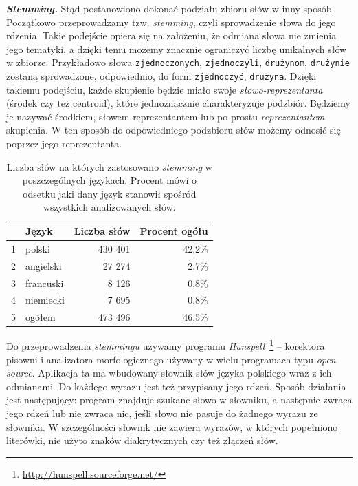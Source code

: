 \documentclass{praca1}
\begin{document}
\emph{\textbf{Stemming.}}
Stąd postanowiono dokonać podziału zbioru słów w inny sposób. Początkowo przeprowadzamy tzw. \emph{stemming}, czyli sprowadzenie słowa do jego rdzenia. Takie podejście opiera się na założeniu, że odmiana słowa nie zmienia jego tematyki, a dzięki temu możemy znacznie ograniczyć liczbę unikalnych słów w zbiorze. Przykładowo słowa \verb|zjednoczonych|, \verb|zjednoczyli|, \verb|drużynom|, \verb|drużynie| zostaną sprowadzone, odpowiednio, do form \verb|zjednoczyć|, \verb|drużyna|. Dzięki takiemu podejściu, każde skupienie będzie miało swoje \emph{słowo-reprezentanta} (środek czy też centroid), które jednoznacznie charakteryzuje podzbiór. Będziemy je nazywać środkiem, słowem-reprezentantem lub po prostu \emph{reprezentantem} skupienia. W ten sposób do odpowiedniego podzbioru słów możemy odnosić się poprzez jego reprezentanta.

\begin{table}[!h]
\centering
\caption{Liczba słów na których zastosowano \emph{stemming} w poszczególnych językach. Procent mówi o odsetku jaki dany język stanowił spośród wszystkich analizowanych słów.}
\begin{tabular}{|rl|rr|}
  \hline
 & Język & Liczba słów & Procent ogółu\\ 
  \hline
1 & polski & 430 401 & 42,2\% \\ 
  2 & angielski & 27 274 & 2,7\% \\ 
  3 & francuski & 8 126 & 0,8\% \\ 
  4 & niemiecki & 7 695 & 0,8\% \\ \hline
  5 & ogółem & 473 496 & 46,5\% \\ 
   \hline
\end{tabular}
\label{tab:002}
\end{table}

Do przeprowadzenia \emph{stemmingu} używamy programu \emph{Hunspell}~\footnote{\url{http://hunspell.sourceforge.net/}} -- korektora pisowni i analizatora morfologicznego używany w wielu programach typu \emph{open source}. Aplikacja ta ma wbudowany słownik słów języka polskiego wraz z ich odmianami. Do każdego wyrazu jest też przypisany jego rdzeń. Sposób działania jest następujący: program znajduje szukane słowo w słowniku, a następnie zwraca jego rdzeń lub nie zwraca nic, jeśli słowo nie pasuje do żadnego wyrazu ze słownika. W szczególności słownik nie zawiera wyrazów, w których popełniono literówki, nie użyto znaków diakrytycznych czy też złączeń słów.
\end{document}

